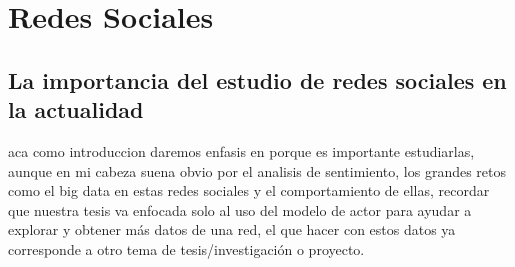 
\chapter{Redes Sociales} %
\label{Chapter3}


\section{La importancia del estudio de redes sociales en la actualidad}
aca como  introduccion daremos enfasis en porque es importante estudiarlas, aunque en mi cabeza suena obvio por el analisis de sentimiento,  los grandes retos como el big data en estas redes sociales y el comportamiento de ellas, recordar que nuestra tesis va enfocada solo al uso del modelo de actor para ayudar a explorar y obtener m\'as datos de una red, el que hacer con estos datos ya corresponde a otro tema de tesis/investigaci\'on o proyecto.
